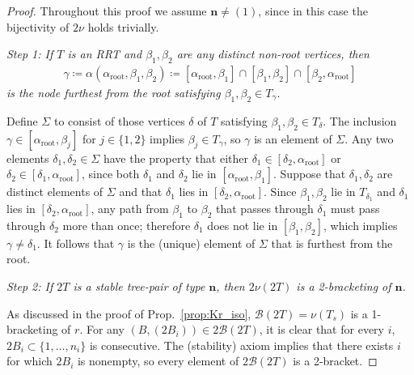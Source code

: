 \documentclass[11pt]{amsart}
\theoremstyle{definition}
\theoremstyle{remark}
\theoremstyle{plain}
\newcommand\bn{\mathbf{n}}
\newcommand{\sB}{\mathscr{B}}
\newcommand{\stB}{2\mathscr{B}}
\newcommand{\on}{\operatorname}
\renewcommand{\root}{{\on{root}}}
\begin{document}
\begin{proof}
Throughout this proof we assume $\bn \neq (1)$, since in this case the bijectivity of $2\nu$ holds trivially.

\medskip

\noindent\emph{Step 1: If $T$ is an RRT and $\beta_1,\beta_2$ are any distinct non-root vertices, then
\begin{align}
\gamma \coloneqq \alpha(\alpha_\root,\beta_1,\beta_2) \coloneqq [\alpha_\root,\beta_1] \cap [\beta_1,\beta_2] \cap [\beta_2,\alpha_\root]
\end{align}
is the node furthest from the root satisfying $\beta_1,\beta_2 \in T_\gamma$.}

\medskip

\noindent Define $\Sigma$ to consist of those vertices $\delta$ of $T$ satisfying $\beta_1,\beta_2 \in T_\delta$.
The inclusion $\gamma \in [\alpha_\root,\beta_j]$ for $j \in \{1,2\}$ implies $\beta_j \in T_\gamma$, so $\gamma$ is an element of $\Sigma$.
Any two elements $\delta_1,\delta_2 \in \Sigma$ have the property that either $\delta_1 \in [\delta_2,\alpha_\root]$ or $\delta_2 \in [\delta_1,\alpha_\root]$, since both $\delta_1$ and $\delta_2$ lie in $[\alpha_\root,\beta_1]$.
Suppose that $\delta_1, \delta_2$ are distinct elements of $\Sigma$ and that $\delta_1$ lies in $[\delta_2,\alpha_\root]$.
Since $\beta_1,\beta_2$ lie in $T_{\delta_1}$ and $\delta_1$ lies in $[\delta_2,\alpha_\root]$, any path from $\beta_1$ to $\beta_2$ that passes through $\delta_1$ must pass through $\delta_2$ more than once; therefore $\delta_1$ does not lie in $[\beta_1,\beta_2]$, which implies $\gamma \neq \delta_1$.
It follows that $\gamma$ is the (unique) element of $\Sigma$ that is furthest from the root.

\medskip

\noindent\emph{Step 2: If $2T$ is a stable tree-pair of type $\bn$, then $2\nu(2T)$ is a 2-bracketing of $\bn$.}

\medskip

As discussed in the proof of Prop.~\ref{prop:Kr_iso}, $\sB(2T) = \nu(T_s)$ is a 1-bracketing of $r$.
For any $(B,(2B_i)) \in \stB(2T)$, it is clear that for every $i$, $2B_i \subset \{1,\ldots,n_i\}$ is consecutive.
The {\sc(stability)} axiom implies that there exists $i$ for which $2B_i$ is nonempty, so every element of $\stB(2T)$ is a 2-bracket.


\end{proof}
\end{document}

